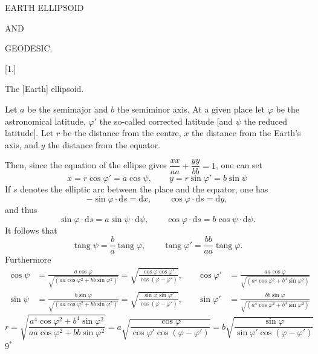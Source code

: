 \clearpage
\vspace*{45mm}
\begin{center}
{\Huge EARTH ELLIPSOID}\par\vspace{10mm}
{\large AND}\par\vspace{10mm}
{\Huge GEODESIC.}
\end{center}
\clearpage
\null
\clearpage
\begin{center}
{\Large{}}\par\vspace{12mm}
[1.]\par
The [Earth] ellipsoid.
\end{center}
Let $a$ be the semimajor and $b$ the semiminor axis. At a given place let $\varphi$ be the
astronomical latitude, $\varphi'$ the so-called corrected latitude
[and $\psi$ the reduced latitude]. Let $r$ be the distance from the centre, $x$ the
distance from the Earth's axis, and $y$ the distance from the equator.

Then, since the equation of the ellipse gives $\dfrac{xx}{aa}+\dfrac{yy}{bb}=1$, one can set
\[
x=r\cos\varphi'=a\cos\psi,\qquad y=r\sin\varphi'=b\sin\psi
\]
If $s$ denotes the elliptic arc between the place and the equator, one has
\[
-\sin\varphi\cdot\mathrm ds=\mathrm dx,\qquad\cos\varphi\cdot\mathrm ds=\mathrm dy,
\]
and thus
\[
\sin\varphi\cdot\mathrm ds=a\sin\psi\cdot\mathrm d\psi,\qquad\cos\varphi\cdot\mathrm ds=b\cos\psi\cdot\mathrm d\psi.
\]
It follows that
\[
\operatorname{tang}\psi=\frac ba\operatorname{tang}\varphi,\qquad\operatorname{tang}\varphi'=\frac{bb}{aa}\operatorname{tang}\varphi.
\]
Furthermore
\[
\begin{aligned}
\cos\psi&=\frac{a\cos\varphi}{\sqrt{(aa\cos\varphi^2+bb\sin\varphi^2)}}=\sqrt{\frac{\cos\varphi\cos\varphi'}{\cos(\varphi-\varphi')}},\quad&\cos\varphi'&=\frac{aa\cos\varphi}{\sqrt{(a^4\cos\varphi^2+b^4\sin\varphi^2)}}\\
\sin\psi&=\frac{b\sin\varphi}{\sqrt{(aa\cos\varphi^2+bb\sin\varphi^2)}}=\sqrt{\frac{\sin\varphi\sin\varphi'}{\cos(\varphi-\varphi')}},&\sin\varphi'&=\frac{bb\sin\varphi}{\sqrt{(a^4\cos\varphi^2+b^4\sin\varphi^2)}}
\end{aligned}
\]
\[
r=\sqrt{\frac{a^4\cos\varphi^2+b^4\sin\varphi^2}{aa\cos\varphi^2+bb\sin\varphi^2}}=a\sqrt{\frac{\cos\varphi}{\cos\varphi'\cos(\varphi-\varphi')}}=b\sqrt{\frac{\sin\varphi}{\sin\varphi'\cos(\varphi-\varphi')}}
\]
\noindent\hfill $9^*$\par

